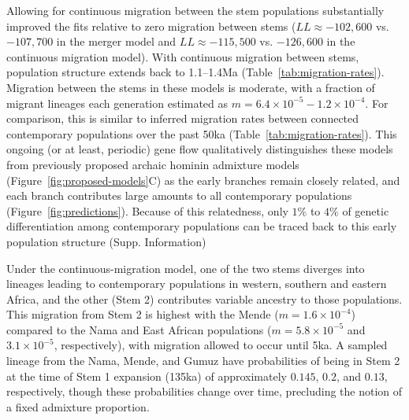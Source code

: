 \documentclass[]{article}
\begin{document}
Allowing for continuous migration between the stem populations substantially
improved the fits relative to zero migration between stems
($LL \approx -102,600$ vs. $-107,700$ in the merger model and
$LL \approx -115,500$ vs. $-126,600$ in the continuous migration model).
With continuous migration between stems, population
structure extends back to 1.1--1.4Ma (Table~\ref{tab:migration-rates}).
Migration between the stems in these models is moderate, with a fraction of
migrant lineages each generation estimated as
$m=6.4\times10^{-5}-1.2\times10^{-4}$. For comparison, this is similar
to inferred migration rates between connected contemporary populations over the
past 50ka (Table~\ref{tab:migration-rates}). This ongoing (or at least,
periodic) gene flow qualitatively distinguishes these models from previously
proposed archaic hominin admixture models (Figure~\ref{fig:proposed-models}C) as
the early branches remain closely related, and each branch contributes large
amounts to all contemporary populations (Figure~\ref{fig:predictions}). 
Because of this relatedness, only $1\%$ to $4\%$ of genetic differentiation
among contemporary populations can be traced back
to this early population structure (Supp. Information)
 
Under the continuous-migration model, one of the two stems diverges into
lineages leading to contemporary populations in western, southern and eastern
Africa, and the other (Stem 2) contributes variable ancestry to those
populations. This migration from Stem 2 is highest with the Mende
($m=1.6\times10^{-4}$) compared to the Nama and East African populations
($m=5.8\times10^{-5}$ and $3.1\times10^{-5}$, respectively), with migration
allowed to occur until 5ka. A
sampled lineage from the Nama, Mende, and Gumuz have probabilities of being in
Stem 2 at the time of Stem 1 expansion (135ka) of approximately $0.145$, $0.2$,
and $0.13$, respectively, though these probabilities change over time,
precluding the notion of a fixed admixture proportion.
\end{document}
